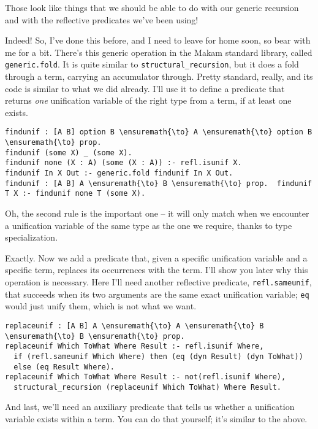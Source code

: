 \noindent
Those look like things that we should be able to do with our generic
recursion and with the reflective predicates we've been using!

\heroADVISOR{} Indeed! So, I've done this before, and I need to leave for home
soon, so bear with me for a bit. There's this generic operation in the
Makam standard library, called \texttt{generic.fold}. It is quite
similar to \texttt{structural\_recursion}, but it does a fold through a
term, carrying an accumulator through. Pretty standard, really, and its
code is similar to what we did already. I'll use it to define a
predicate that returns \emph{one} unification variable of the right type
from a term, if at least one exists.

\begin{verbatim}
findunif : [A B] option B \ensuremath{\to} A \ensuremath{\to} option B \ensuremath{\to} prop.
findunif (some X) _ (some X).
findunif none (X : A) (some (X : A)) :- refl.isunif X.
findunif In X Out :- generic.fold findunif In X Out.
findunif : [A B] A \ensuremath{\to} B \ensuremath{\to} prop.  findunif T X :- findunif none T (some X).
\end{verbatim}

\heroSTUDENT{} Oh, the second rule is the important one -- it will only match
when we encounter a unification variable of the same type as the one we
require, thanks to type specialization.

\heroADVISOR{} Exactly. Now we add a predicate that, given a specific
unification variable and a specific term, replaces its occurrences with
the term. I'll show you later why this operation is necessary. Here I'll
need another reflective predicate, \texttt{refl.sameunif}, that succeeds
when its two arguments are the same exact unification variable;
\texttt{eq} would just unify them, which is not what we want.

\begin{verbatim}
replaceunif : [A B] A \ensuremath{\to} A \ensuremath{\to} B \ensuremath{\to} B \ensuremath{\to} prop.
replaceunif Which ToWhat Where Result :- refl.isunif Where,
  if (refl.sameunif Which Where) then (eq (dyn Result) (dyn ToWhat))
  else (eq Result Where).
replaceunif Which ToWhat Where Result :- not(refl.isunif Where),
  structural_recursion (replaceunif Which ToWhat) Where Result.
\end{verbatim}

\heroADVISOR{} And last, we'll need an auxiliary predicate that tells us
whether a unification variable exists within a term. You can do that
yourself; it's similar to the above.

